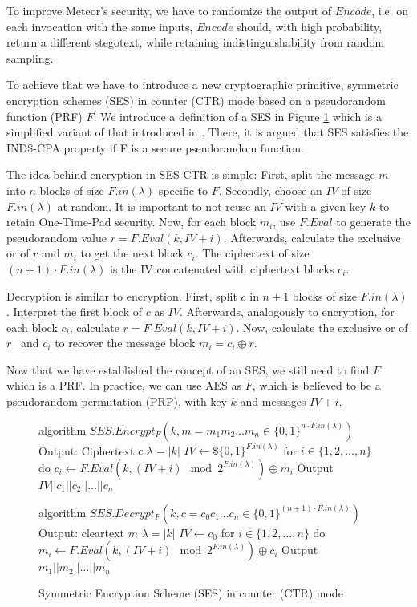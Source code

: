 To improve Meteor's security, we have to randomize the output of $Encode$, i.e. on each invocation with the same inputs, $Encode$ should, with high probability, return a different stegotext, while retaining indistinguishability from random sampling.

To achieve that we have to introduce a new cryptographic primitive, symmetric encryption schemes (SES) in counter (CTR) mode based on a pseudorandom function (PRF) $F$.
We introduce a definition of a SES in Figure \ref{fig:ses} which is a simplified variant of that introduced in \cite{Berndt2017}.
There, it is argued that SES satisfies the IND\$-CPA property if F is a secure pseudorandom function.

The idea behind encryption in SES-CTR is simple:
First, split the message $m$ into $n$ blocks of size $F.in(\lambda)$ specific to $F$.
Secondly, choose an $IV$ of size $F.in(\lambda)$ at random.
It is important to not reuse an $IV$ with a given key $k$ to retain One-Time-Pad security.
Now, for each block $m_i$, use $F.Eval$ to generate the pseudorandom value $r = F.Eval(k, IV+i)$.
Afterwards, calculate the exclusive or of $r$ and $m_i$ to get the next block $c_i$.
The ciphertext of size $(n+1)\cdot F.in(\lambda)$ is the IV concatenated with ciphertext blocks $c_i$.

Decryption is similar to encryption.
First, split $c$ in $n+1$ blocks of size $F.in(\lambda)$.
Interpret the first block of $c$ as $IV$.
Afterwards, analogously to encryption, for each block $c_i$, calculate $r = F.Eval(k, IV+i)$.
Now, calculate the exclusive or of $r$~ and $c_i$ to recover the message block $m_i = c_i \oplus r$.

Now that we have established the concept of an SES, we still need to find $F$ which is a PRF.
In practice, we can use AES as $F$, which is believed to be a pseudorandom permutation (PRP), with key $k$ and messages $IV+i$.

\begin{figure}[htbp]%
	\centering%
	\begin{Pseudocode}%
algorithm $SES.Encrypt_F(k, m=m_1 m_2 \dots m_n \in \{0,1\}^{n\cdot F.in(\lambda)})$
	Output: Ciphertext $c$
	$\lambda = |k|$
	$IV \leftarrow\$ \{0,1\}^{F.in(\lambda)}$
	for $i \in \{ 1, 2, \dots, n \}$ do
		$c_i \leftarrow F.Eval(k, (IV+i) \mod 2^{F.in(\lambda)}) \oplus m_i$
	Output $IV||c_1||c_2||\dots||c_n$
	\end{Pseudocode}%
	\begin{Pseudocode}%
algorithm $SES.Decrypt_F(k, c=c_0 c_1 \dots c_n \in \{0,1\}^{(n+1)\cdot F.in(\lambda)})$
	Output: cleartext $m$
	$\lambda = |k|$
	$IV \leftarrow c_0$
	for $i \in \{ 1, 2, \dots, n \}$ do
		$m_i \leftarrow F.Eval(k, (IV+i) \mod 2^{F.in(\lambda)}) \oplus c_i$
	Output $m_1||m_2||\dots||m_n$
	\end{Pseudocode}%
	\caption{Symmetric Encryption Scheme (SES) in counter (CTR) mode}%
	\label{fig:ses}%
\end{figure}%


